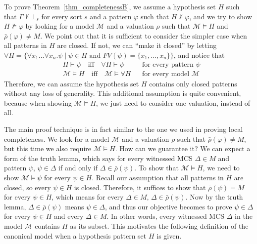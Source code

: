 \documentclass[acmsmall]{acmart}
\theoremstyle{acmdefinition}
\newcommand{\MM}{\mathcal{M}}
\newcommand{\barrho}{\bar{\rho}}
\newcommand{\fv}{\mathit{FV}}
\newcommand{\FV}{\fv}
\newcommand{\ddd}{,\dots,}
\newcommand{\txtand}{\text{ and }}
\begin{document}
To prove Theorem~\ref{thm_completenessB}, 
we assume a hypothesis set $H$ such that
$\Gamma \not\vdash \bot_s$ for every sort $s$
and a pattern $\varphi$ 
such that $H \not\vdash \varphi$, and we try to show
$H \not\vDash \varphi$
by looking for a model $\MM$ and a valuation $\rho$ such that
$\MM \vDash H$ and $\barrho(\varphi) \neq M$.
We point out that it is sufficient to
consider the simpler case when all patterns in $H$ are closed.
If not,
we can ``make it closed'' by letting
$\forall H = 
 \{ \forall x_1 \dots \forall x_n . \psi
    \mid \psi \in H 
    \txtand \FV(\psi) = \{ x_1 \ddd x_n \}   \}$,
and notice that
\begin{align*}
& H \vdash \psi \quad\text{iff}\quad
  \forall H \vdash \psi
&& \text{for every pattern $\psi$}
\\
& \MM \vDash H \quad\text{iff}\quad
  \MM \vDash \forall H
&& \text{for every model $\MM$}
\end{align*}
Therefore, 
we can assume
the hypothesis set $H$ contains only closed
patterns without any loss of generality.
This additional assumption is quite convenient,
because when showing $\MM \vDash H$,
we just need to consider one valuation, instead of all.

The main proof technique is in fact similar
to the one we used in proving local completeness.
We look for a model $\MM$ and a valuation $\rho$ such that
$\barrho(\varphi) \neq M$,
but this time we also require $\MM \vDash H$.
How can we guarantee it?
We can expect a form of the truth lemma, which says
for every witnessed MCS $\Delta \in M$ and pattern $\psi$,
$\psi \in \Delta$ if and only if $\Delta \in \barrho(\psi)$.
To show that $\MM \vDash H$, we need to show
$\MM \vDash \psi$ for every $\psi \in H$.
Recall our assumption that all patterns in $H$ are closed,
so every $\psi \in H$ is closed.
Therefore, it suffices to show that
$\barrho(\psi) = M$
for every $\psi \in H$,
which means for every $\Delta \in M$, $\Delta \in \barrho(\psi)$.
Now by the truth lemma,
$\Delta \in \barrho(\psi)$ means
$\psi \in \Delta$, and thus our objective becomes to prove
$\psi \in \Delta$
for every $\psi \in H$ and every $\Delta \in M$.
In other words, every witnessed MCS $\Delta$ in the model $\MM$
contains $H$ as its subset.
This motivates the following definition of the canonical model
when a hypothesis pattern set $H$ is given.
\end{document}
